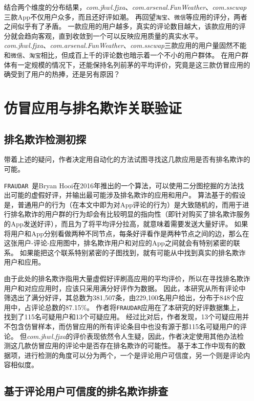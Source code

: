 结合两个维度的分布结果，\emph{com.jhwl.fjxa}、\emph{com.arsenal.FunWeather}、\emph{com.sscwap}三款App不仅用户众多，而且还好评如潮。
再回望\texttt{淘宝}、\texttt{微信}等应用的评分，两者之间似乎有了矛盾。
一款应用的用户越多，真实的评论数目越大，该款应用的评分就会趋向客观，直到收敛到一个可以反映应用质量的真实水平。
\emph{com.jhwl.fjxa}、\emph{com.arsenal.FunWeather}、\emph{com.sscwap}三款应用的用户量固然不能和\texttt{微信}、\texttt{淘宝}相比，但成百上千的评论数也暗示着一个不小的用户群体。
在用户群体有一定规模的情况下，还能保持名列前茅的平均评价，究竟是这三款仿冒应用的确受到了用户的热捧，还是另有原因？

\section{仿冒应用与排名欺诈关联验证}

\subsection{排名欺诈检测初探}

带着上述的疑问，作者决定用自动化的方法试图寻找这几款应用是否有排名欺诈的可能。

\texttt{FRAUDAR}~\cite{hooi2016fraudar}是Bryan Hooi在2016年推出的一个算法，可以使用二分图挖掘的方法找出可能的虚假好评，并输出最可能涉及排名欺诈的应用和用户。
算法基于的假设是，普通用户的行为（在本文中即为对App评论的行为）是大致随机的，而用于进行排名欺诈的用户群的行为却会有比较明显的指向性（即针对购买了排名欺诈服务的App发送好评），而且为了将平均评分拉高，就意味着需要发送大量好评。
如果将用户和App分别看做两种不同节点，每条好评看作是两种节点之间的边，那么在这张用户-评论-应用图中，排名欺诈用户和对应的App之间就会有特别紧密的联系。
如果能把这个联系特别紧密的子图找到，就有可能从中找到真实的排名欺诈用户和应用。

由于此处的排名欺诈指用大量虚假好评刷高应用的平均评价，所以在寻找排名欺诈用户和对应应用时，应该只采用满分好评作为数据。
因此，本研究从所有评论中筛选出了满分好评，其总数为381,507条，由229,100名用户给出，分布于848个应用中，占评论总数的87.15\%。
作者将\texttt{FRAUDAR}应用在了本研究的好评数据集上，找到了115名可疑用户和13个可疑应用。
经过比对后，作者发现，13个可疑应用并不包含仿冒样本，而仿冒应用的所有评论条目中也没有源于那115名可疑用户的评论。
但\emph{com.jhwl.fjxa}的评价表现依然令人生疑，因此，作者决定使用其他办法检测这几款仿冒应用的评论中是否存在排名欺诈的可能性。
基于本工作中现有的数据项，进行检测的角度可以分为两个，一个是评论用户可信度，另一个则是评论内容相似度。

\subsection{基于评论用户可信度的排名欺诈排查}

